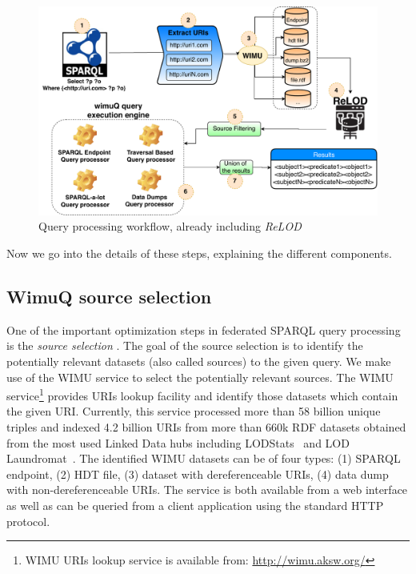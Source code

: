 \begin{figure}[htb] 
	\centering
	\includegraphics[width=\linewidth]{img/wimuQ2.pdf}
	\caption{Query processing workflow, already including \emph{ReLOD}\cite{valdestilhasSWJ2020}}
	\label{fig:approachWimuQ2}
\end{figure}

Now we go into the details of these steps, explaining the different components. 

\subsection{WimuQ source selection}
One of the important optimization steps in federated SPARQL query processing is the \emph{source selection} \cite{costfed2017,hibiscus2014}. The goal of the source selection is to identify the potentially relevant datasets (also called sources) to the given query. We make use of the WIMU service \cite{valdestilhas2018my} to select the potentially relevant sources. The WIMU service\footnote{WIMU URIs lookup service is available from: \url{http://wimu.aksw.org/}} provides URIs lookup facility and identify those datasets which contain the given URI. Currently, this service processed more than 58 billion unique triples and indexed 4.2 billion URIs from more than 660k RDF datasets obtained from the most used Linked Data hubs including LODStats~\cite{auer2012lodstats} and LOD Laundromat~\cite{beek2014lod}. The identified WIMU datasets can be of four types: (1) SPARQL endpoint, (2) HDT file, (3) dataset with dereferenceable URIs, (4) data dump with non-dereferenceable URIs. 
The service is both available from a web interface as well as can be queried from a client application using the standard HTTP protocol. 

